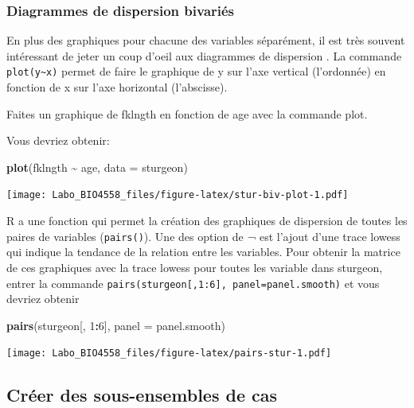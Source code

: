 \documentclass[
  12pt,
]{book}
\makeatletter
\newenvironment{Shaded}{\begin{snugshade}}{\end{snugshade}}
\newcommand{\DataTypeTok}[1]{\textcolor[rgb]{0.13,0.29,0.53}{#1}}
\newcommand{\DecValTok}[1]{\textcolor[rgb]{0.00,0.00,0.81}{#1}}
\newcommand{\KeywordTok}[1]{\textcolor[rgb]{0.13,0.29,0.53}{\textbf{#1}}}
\newcommand{\NormalTok}[1]{#1}
\newcommand{\OperatorTok}[1]{\textcolor[rgb]{0.81,0.36,0.00}{\textbf{#1}}}
\newcommand{\StringTok}[1]{\textcolor[rgb]{0.31,0.60,0.02}{#1}}
\newenvironment{kframe}{%
\medskip{}
\setlength{\fboxsep}{.8em}
\def\at@end@of@kframe{}%
\ifinner\ifhmode%
 \def\at@end@of@kframe{\end{minipage}}%
 \begin{minipage}{\columnwidth}%
\fi\fi%
\def\FrameCommand##1{\hskip\@totalleftmargin \hskip-\fboxsep
\colorbox{incolor}{##1}\hskip-\fboxsep
    \hskip-\linewidth \hskip-\@totalleftmargin \hskip\columnwidth}%
\MakeFramed {\advance\hsize-\width
  \@totalleftmargin\z@ \linewidth\hsize
  \@setminipage}}%
{\par\unskip\endMakeFramed%
\at@end@of@kframe}
\newenvironment{rmdblock}[1]
 {
 \begin{itemize}
 \renewcommand{\labelitemi}{
   \raisebox{-.7\height}[0pt][0pt]{
     {\setkeys{Gin}{width=3em,keepaspectratio}\texttt{[image: images/\#1]}}
   }
 }
 \begin{kframe}
 \setlength{\fboxsep}{1em}
 \item
 }
 {
 \end{kframe}
 \end{itemize}
 }
\newenvironment{rmdcode}
  {\begin{rmdblock}{screen}}
  {\end{rmdblock}}
\makeatother
\begin{document}
\hypertarget{diagrammes-de-dispersion-bivariuxe9s}{%
\subsubsection{Diagrammes de dispersion bivariés}\label{diagrammes-de-dispersion-bivariuxe9s}}

En plus des graphiques pour chacune des variables séparément, il est très souvent intéressant de jeter un coup d'oeil aux diagrammes de dispersion .
La commande \texttt{plot(y\textasciitilde{}x)} permet de faire le graphique de y sur l'axe vertical (l'ordonnée) en fonction de x sur l'axe horizontal (l'abscisse).

\begin{rmdcode}
Faites un graphique de fklngth en fonction de age avec la commande plot.
\end{rmdcode}

Vous devriez obtenir:

\begin{Shaded}
\begin{Highlighting}[]
\KeywordTok{plot}\NormalTok{(fklngth }\OperatorTok{\textasciitilde{}}\StringTok{ }\NormalTok{age, }\DataTypeTok{data =}\NormalTok{ sturgeon)}
\end{Highlighting}
\end{Shaded}

\texttt{[image: Labo\_BIO4558\_files/figure-latex/stur-biv-plot-1.pdf]}

R a une fonction qui permet la création des graphiques de dispersion de toutes les paires de variables (\texttt{pairs()}).
Une des option de ¬ est l'ajout d'une trace lowess qui indique la tendance de la relation entre les variables.
Pour obtenir la matrice de ces graphiques avec la trace lowess pour toutes les variable dans sturgeon, entrer la commande \texttt{pairs(sturgeon{[},1:6{]},\ panel=panel.smooth)} et vous devriez obtenir

\begin{Shaded}
\begin{Highlighting}[]
\KeywordTok{pairs}\NormalTok{(sturgeon[, }\DecValTok{1}\OperatorTok{:}\DecValTok{6}\NormalTok{], }\DataTypeTok{panel =}\NormalTok{ panel.smooth)}
\end{Highlighting}
\end{Shaded}

\texttt{[image: Labo\_BIO4558\_files/figure-latex/pairs-stur-1.pdf]}

\hypertarget{cruxe9er-des-sous-ensembles-de-cas}{%
\subsection{Créer des sous-ensembles de cas}\label{cruxe9er-des-sous-ensembles-de-cas}}
\end{document}
